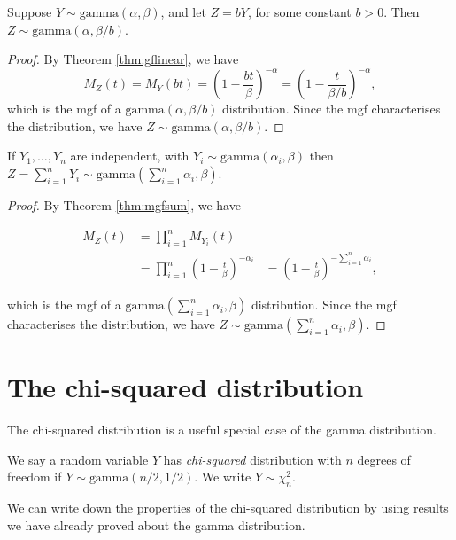 \documentclass[]{book}
\theoremstyle{definition}
\theoremstyle{definition}
\theoremstyle{definition}
\theoremstyle{remark}
\let\BeginKnitrBlock\begin \let\EndKnitrBlock\end
\begin{document}
\BeginKnitrBlock{proposition}
\protect\hypertarget{prp:gammascale}{}{\label{prp:gammascale} }Suppose
\(Y \sim \text{gamma}(\alpha, \beta)\), and let \(Z = bY\), for some
constant \(b > 0\). Then \(Z \sim \text{gamma}(\alpha, \beta / b)\).
\EndKnitrBlock{proposition} \BeginKnitrBlock{proof}

\iffalse{} {Proof. } \fi{}By Theorem \ref{thm:gflinear}, we have
\[M_Z(t) = M_Y(bt) = \left( 1 - \frac{bt}{\beta} \right)^{-\alpha}
= \left(1 - \frac{t}{\beta/b}\right)^{-\alpha},\] which is the mgf of a
\(\text{gamma}(\alpha, \beta / b)\) distribution. Since the mgf
characterises the distribution, we have
\(Z \sim \text{gamma}(\alpha, \beta / b)\).
\EndKnitrBlock{proof}

\BeginKnitrBlock{proposition}
\protect\hypertarget{prp:gammasum}{}{\label{prp:gammasum} }If
\(Y_1, \ldots, Y_n\) are independent, with
\(Y_i \sim \text{gamma}(\alpha_i, \beta)\) then
\(Z = \sum_{i=1}^n Y_i \sim \text{gamma}(\sum_{i=1}^n \alpha_i, \beta)\).
\EndKnitrBlock{proposition} \BeginKnitrBlock{proof}

\iffalse{} {Proof. } \fi{}By Theorem \ref{thm:mgfsum}, we have

\begin{align*}
M_Z(t) &= \prod_{i=1}^n M_{Y_i}(t) \\
&= \prod_{i=1}^n \left( 1 - \frac{t}{\beta} \right)^{-\alpha_i}
&= \left( 1 - \frac{t}{\beta} \right)^{-\sum_{i=1}^n \alpha_i},
\end{align*}

which is the mgf of a \(\text{gamma}(\sum_{i=1}^n \alpha_i, \beta)\)
distribution. Since the mgf characterises the distribution, we have
\(Z \sim \text{gamma}(\sum_{i=1}^n \alpha_i, \beta)\).
\EndKnitrBlock{proof}

\section{The chi-squared distribution}\label{chisquared}

The chi-squared distribution is a useful special case of the gamma
distribution.

\BeginKnitrBlock{definition}
\protect\hypertarget{def:chisquared}{}{\label{def:chisquared} }We say a
random variable \(Y\) has \emph{chi-squared} distribution with \(n\)
degrees of freedom if \(Y \sim \text{gamma}(n/2, 1/2)\). We write
\(Y \sim \chi^2_n\).
\EndKnitrBlock{definition} We can write down the properties of the
chi-squared distribution by using results we have already proved about
the gamma distribution.
\end{document}

